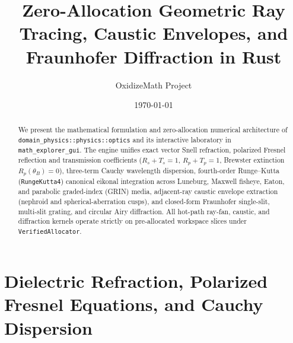 \documentclass[12pt]{article}
\title{Zero-Allocation Geometric Ray Tracing, Caustic Envelopes, and Fraunhofer Diffraction in Rust}
\author{OxidizeMath Project}
\date{\today}
\begin{document}
\maketitle

\begin{abstract}
We present the mathematical formulation and zero-allocation numerical architecture of \texttt{domain\_physics::physics::optics} and its interactive laboratory in \texttt{math\_explorer\_gui}. The engine unifies exact vector Snell refraction, polarized Fresnel reflection and transmission coefficients ($R_s + T_s = 1$, $R_p + T_p = 1$, Brewster extinction $R_p(\theta_B) = 0$), three-term Cauchy wavelength dispersion, fourth-order Runge--Kutta (\texttt{RungeKutta4}) canonical eikonal integration across Luneburg, Maxwell fisheye, Eaton, and parabolic graded-index (GRIN) media, adjacent-ray caustic envelope extraction (nephroid and spherical-aberration cusps), and closed-form Fraunhofer single-slit, multi-slit grating, and circular Airy diffraction. All hot-path ray-fan, caustic, and diffraction kernels operate strictly on pre-allocated workspace slices under \texttt{VerifiedAllocator}.
\end{abstract}

\section{Dielectric Refraction, Polarized Fresnel Equations, and Cauchy Dispersion}
\end{document}

